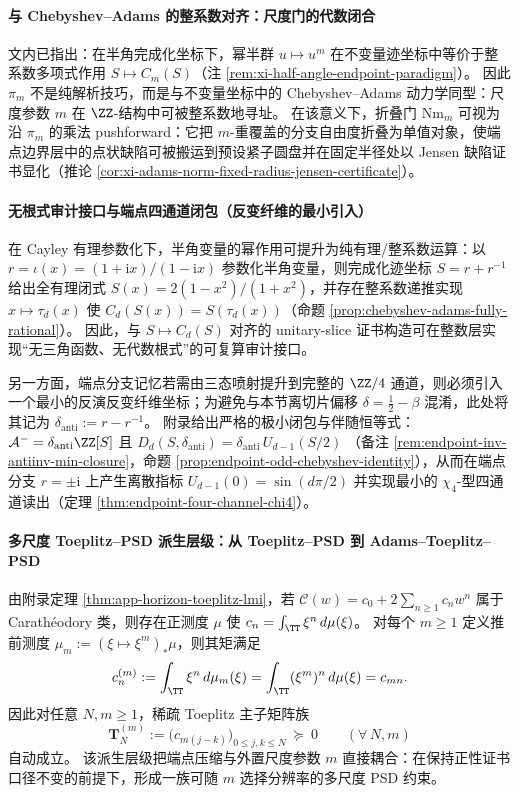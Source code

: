 \paragraph{与 Chebyshev--Adams 的整系数对齐：尺度门的代数闭合}
文内已指出：在半角完成化坐标下，幂半群 \(u\mapsto u^m\) 在不变量迹坐标中等价于整系数多项式作用 \(S\mapsto C_m(S)\)（注 \ref{rem:xi-half-angle-endpoint-paradigm}）。
因此 \(\pi_m\) 不是纯解析技巧，而是与不变量坐标中的 Chebyshev--Adams 动力学同型：尺度参数 \(m\) 在 \(\ZZ\)-结构中可被整系数地寻址。
在该意义下，折叠门 \(\mathrm{Nm}_m\) 可视为沿 \(\pi_m\) 的乘法 pushforward：它把 \(m\)-重覆盖的分支自由度折叠为单值对象，使端点边界层中的点状缺陷可被搬运到预设紧子圆盘并在固定半径处以 Jensen 缺陷证书显化（推论 \ref{cor:xi-adams-norm-fixed-radius-jensen-certificate}）。

\paragraph{无根式审计接口与端点四通道闭包（反变纤维的最小引入）}
在 Cayley 有理参数化下，半角变量的幂作用可提升为纯有理/整系数运算：以
\(
r=\iota(x)=(1+\mathrm{i}x)/(1-\mathrm{i}x)
\)
参数化半角变量，则完成化迹坐标 \(S=r+r^{-1}\) 给出全有理闭式 \(S(x)=2(1-x^{2})/(1+x^{2})\)，并存在整系数递推实现 \(x\mapsto\tau_d(x)\) 使 \(C_d(S(x))=S(\tau_d(x))\)（命题 \ref{prop:chebyshev-adams-fully-rational}）。
因此，与 \(S\mapsto C_d(S)\) 对齐的 unitary-slice 证书构造可在整数层实现“无三角函数、无代数根式”的可复算审计接口。
\par
另一方面，端点分支记忆若需由三态喷射提升到完整的 \(\ZZ/4\) 通道，则必须引入一个最小的反演反变纤维坐标；为避免与本节离切片偏移 \(\delta=\tfrac12-\beta\) 混淆，此处将其记为
\(
\delta_{\mathrm{anti}}:=r-r^{-1}
\)。
附录给出严格的极小闭包与伴随恒等式：
\(
\mathcal A^{-}=\delta_{\mathrm{anti}}\ZZ[S]
\)
且
\(
D_d(S,\delta_{\mathrm{anti}})=\delta_{\mathrm{anti}}\,U_{d-1}(S/2)
\)
（备注 \ref{rem:endpoint-inv-antiinv-min-closure}，命题 \ref{prop:endpoint-odd-chebyshev-identity}），从而在端点分支 \(r=\pm\mathrm{i}\) 上产生离散指标 \(U_{d-1}(0)=\sin(d\pi/2)\) 并实现最小的 \(\chi_4\)-型四通道读出（定理 \ref{thm:endpoint-four-channel-chi4}）。

\paragraph{多尺度 Toeplitz--PSD 派生层级：从 Toeplitz--PSD 到 Adams--Toeplitz--PSD}
由附录定理 \ref{thm:app-horizon-toeplitz-lmi}，若 \(\mathscr{C}(w)=c_0+2\sum_{n\ge 1}c_n w^n\) 属于 Carath\'eodory 类，则存在正测度 \(\mu\) 使
\(
c_n=\int_{\TT}\xi^n\,d\mu(\xi)
\)。
对每个 \(m\ge 1\) 定义推前测度 \(\mu_m:=(\xi\mapsto \xi^m)_*\mu\)，则其矩满足
\[
c^{(m)}_n:=\int_{\TT}\xi^n\,d\mu_m(\xi)=\int_{\TT}(\xi^m)^n\,d\mu(\xi)=c_{mn}.
\]
因此对任意 \(N,m\ge 1\)，稀疏 Toeplitz 主子矩阵族
\begin{equation}\label{eq:xi-adams-toeplitz-psd}
\boxed{\;
\mathbf{T}^{(m)}_N
:=\bigl(c_{m(j-k)}\bigr)_{0\le j,k\le N}\ \succeq\ 0\qquad(\forall\,N,m)\;}
\end{equation}
自动成立。
该派生层级把端点压缩与外置尺度参数 \(m\) 直接耦合：在保持正性证书口径不变的前提下，形成一族可随 \(m\) 选择分辨率的多尺度 PSD 约束。

